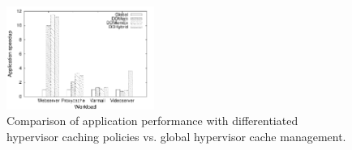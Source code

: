 \begin{figure}[t]
  \centering
\includegraphics[width=0.43\textwidth]{data/singlevm_policy/speedup}
\vspace{-0.2cm}
 \caption{Comparison of application performance with differentiated 
          hypervisor caching policies vs. global hypervisor cache
          management.}
 \label{fig:policy_speedup}
\vspace{-0.4cm}
\end{figure} 
